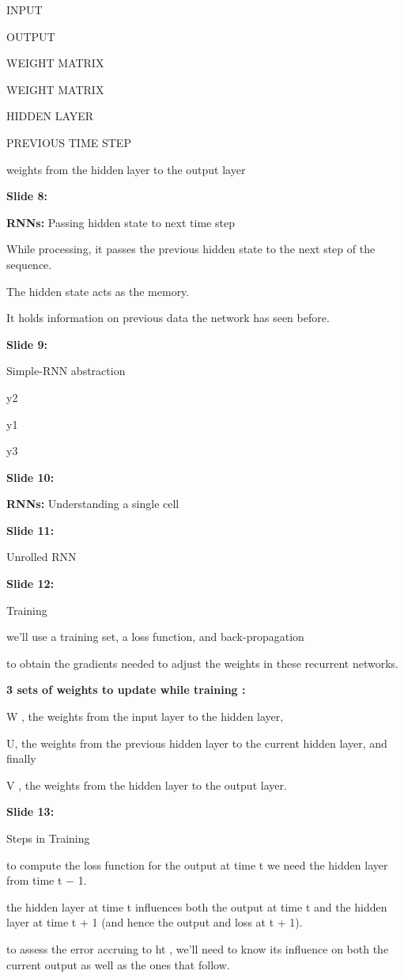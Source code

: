 \documentclass[11pt,a4paper]{article}
\begin{document}
INPUT

OUTPUT

WEIGHT MATRIX

WEIGHT MATRIX

HIDDEN LAYER

PREVIOUS TIME STEP

weights from the hiddenlayer to the output layer

\textbf{Slide 8:}

\textbf{RNNs:}  Passing hidden state to next time step

While processing, it passes the previous hidden state to the next step of the sequence.

The hidden state acts as the memory.

It holds information on previous data the network has seen before.

\textbf{Slide 9:}

Simple-RNN abstraction

y2

y1

y3

\textbf{Slide 10:}

\textbf{RNNs:}  Understanding a single cell

\textbf{Slide 11:}

Unrolled RNN

\textbf{Slide 12:}

Training

we’ll use a training set, a loss function, and back-propagation

to obtain the gradients needed to adjust the weights in these recurrent networks.

\textbf{3 sets of weights to update while training :} 

W , the weights from the input layer to the hidden layer,

U, the weights from the previous hidden layer to the current hidden layer, and finally

V , the weights from the hidden layer to the output layer.

\textbf{Slide 13:}

Steps in Training

to compute the loss function for the output at time t we need the hidden layer from time t − 1.

the hidden layer at time t influences both the output at time t and the hidden layer at time t + 1 (and hence the output and loss at t + 1).

to assess the error accruing to ht , we’ll need to know its influence on both the current output as well as the ones that follow.
\end{document}
